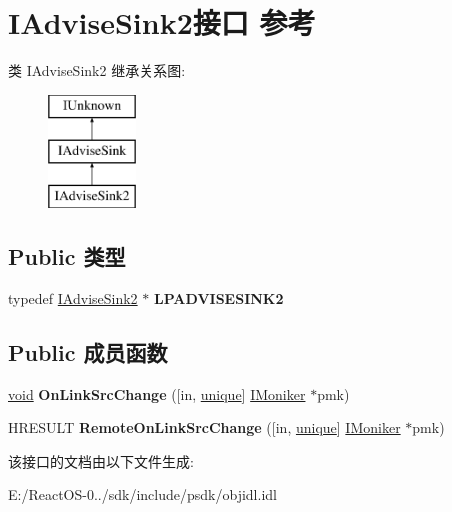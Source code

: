 \hypertarget{interface_i_advise_sink2}{}\section{I\+Advise\+Sink2接口 参考}
\label{interface_i_advise_sink2}
类 I\+Advise\+Sink2 继承关系图\+:\begin{figure}[H]
\begin{center}
\leavevmode
\includegraphics[height=3.000000cm]{interface_i_advise_sink2}
\end{center}
\end{figure}
\subsection*{Public 类型}
\begin{DoxyCompactItemize}
\item 
\mbox{\label{interface_i_advise_sink2_ada94f6c1ac8b6f72a298f95af5e00cc1}} 
typedef \hyperlink{interface_i_advise_sink2}{I\+Advise\+Sink2} $\ast$ {\bfseries L\+P\+A\+D\+V\+I\+S\+E\+S\+I\+N\+K2}
\end{DoxyCompactItemize}
\subsection*{Public 成员函数}
\begin{DoxyCompactItemize}
\item 
\mbox{\label{interface_i_advise_sink2_a367c1882525912e88c44f2f66a67f1dc}} 
\hyperlink{interfacevoid}{void} {\bfseries On\+Link\+Src\+Change} (\mbox{[}in, \hyperlink{interfaceunique}{unique}\mbox{]} \hyperlink{interface_i_moniker}{I\+Moniker} $\ast$pmk)
\item 
\mbox{\label{interface_i_advise_sink2_a088cf60c266e6b56b1b27143c4bb1a76}} 
H\+R\+E\+S\+U\+LT {\bfseries Remote\+On\+Link\+Src\+Change} (\mbox{[}in, \hyperlink{interfaceunique}{unique}\mbox{]} \hyperlink{interface_i_moniker}{I\+Moniker} $\ast$pmk)
\end{DoxyCompactItemize}


该接口的文档由以下文件生成\+:\begin{DoxyCompactItemize}
\item 
E\+:/\+React\+O\+S-\/0../sdk/include/psdk/objidl.\+idl\end{DoxyCompactItemize}
